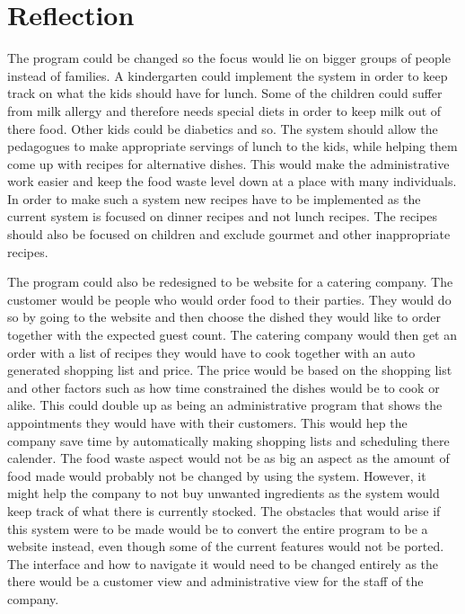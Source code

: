 \section{Reflection}
The program could be changed so the focus would lie on bigger groups of people instead of families. A kindergarten could implement the system in order to keep track on what the kids should have for lunch. Some of the children could suffer from milk allergy and therefore needs special diets in order to keep milk out of there food. Other kids could be diabetics and so. The system should allow the pedagogues to make appropriate servings of lunch to the kids, while helping them come up with recipes for alternative dishes. This would make the administrative work easier and keep the food waste level down at a place with many individuals. In order to make such a system new recipes have to be implemented as the current system is focused on dinner recipes and not lunch recipes. The recipes should also be focused on children and exclude gourmet and other inappropriate recipes.

The program could also be redesigned to be website for a catering company. The customer would be people who would order food to their parties. They would do so by going to the website and then choose the dished they would like to order together with the expected guest count. The catering company would then get an order with a list of recipes they would have to cook together with an auto generated shopping list and price. The price would be based on the shopping list and other factors such as how time constrained the dishes would be to cook or alike. This could double up as being an administrative program that shows the appointments they would have with their customers. This would hep the company save time by automatically making shopping lists and scheduling there calender. The food waste aspect would not be as big an aspect as the amount of food made would probably not be changed by using the system. However, it might help the company to not buy unwanted ingredients as the system would keep track of what there is currently stocked. The obstacles that would arise if this system were to be made would be to convert the entire program to be a website instead, even though some of the current features would not be ported. The interface and how to navigate it would need to be changed entirely as the there would be a customer view and administrative view for the staff of the company. 
